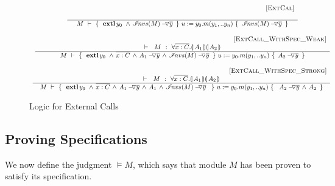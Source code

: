  





\small{
\begin{figure}[hbt]
$\begin{array}{c}
\inferruleSD{\hspace{4.7cm} [\sc{ExtCal}]}
	{ 
   	 
        }
	{   \hproves{M} 
						{ \    { \external{y_0} }\,     \wedge \,  \PushAS {y}{\extract{M}}\   }
						{ \ u:=y_0.m(y_1,.. y_n)\    }
						{ \    \PushAS {y}{\extract{M}}   \ }	
}
\\
\\
\inferruleSD{\hspace{4.7cm} [\sc{ExtCall\_WithSpec\_Weak}]}
	{ 
   	\promises M   {\TwoStatesQ {\overline {x:C}} {A_1}{A_2}}
        }
	{   \hproves{M} 
						{ \    { \external{y_0} }\, \wedge \, \overline {x:C}  \, \wedge \,  \PushAS  {y}{  A_1} \,   \wedge \,  \PushAS {y}{\extract{M}}\   }
						{ \ u:=y_0.m(y_1,.. y_n)\    }
						{ \ \PushAS  {y} { A_2}     \ }	
}
\\
\\
\inferruleSD{\hspace{4.7cm}[\sc{ExtCall\_WithSpec\_Strong}]}
	{        	
	\promises M   {\TwoStatesQ {\overline {x:C}} {A_1}{A_2}}
   	}
	{   \hproves{M} 
						{ \  {\external{y_0}  } \, \wedge\, \overline {x:C}\, \wedge\,  \PushAS  {y} { A_1} \, \wedge\,  A_1\, \wedge\,  \PushAS {y}{\extract{M}}\   \  }
						{ \ u:=y_0.m(y_1,.. y_n)\    }
						{ \  \ \PushAS  {y} { A_2}\,  \wedge\, A_2 \  }	
}\
\\
\end{array}
$
\caption{Logic for External Calls}
\label{f:external:calls}
\end{figure}
}




\subsection{Proving \SpecLang Specifications}

We now define the judgment $\models M$, which says that module $M$ has been proven to satisfy its specification.


